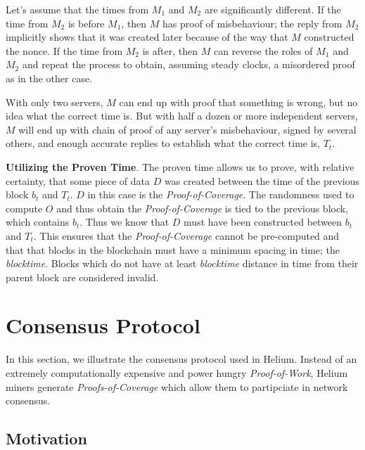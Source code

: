 \documentclass[letterpaper,11pt]{article}
\begin{document}
Let's assume that the times from $M_1$ and $M_2$ are significantly different. If the time from $M_2$ is before $M_1$, then $M$ has proof of misbehaviour; the reply from $M_2$ implicitly shows that it was created later because of the way that $M$ constructed the nonce. If the time from $M_2$ is after, then $M$ can reverse the roles of $M_1$ and $M_2$ and repeat the process to obtain, assuming steady clocks, a misordered proof as in the other case.

With only two servers, $M$ can end up with proof that something is wrong, but no idea what the correct time is. But with half a dozen or more independent servers, $M$ will end up with chain of proof of any server's misbehaviour, signed by several others, and enough accurate replies to establish what the correct time is, $T_t$.

\textbf{Utilizing the Proven Time}. The proven time allows us to prove, with relative certainty, that some piece of data $D$ was created between the time of the previous block $b_t$ and $T_t$. $D$ in this case is the \emph{Proof-of-Coverage}. The randomness used to compute $O$ and thus obtain the \emph{Proof-of-Coverage} is tied to the previous block, which contains $b_t$. Thus we know that $D$ must have been constructed between $b_t$ and $T_t$. This ensures that the \emph{Proof-of-Coverage} cannot be pre-computed and that that blocks in the blockchain must have a minimum spacing in time; the \emph{blocktime}. Blocks which do not have at least \emph{blocktime} distance in time from their parent block are considered invalid.

\section{Consensus Protocol}\label{consensus}

In this section, we illustrate the consensus protocol used in Helium. Instead of an extremely computationally expensive and power hungry \emph{Proof-of-Work}, Helium miners generate \emph{Proofs-of-Coverage} which allow them to partipciate in network consensus.

\subsection{Motivation}
\end{document}
